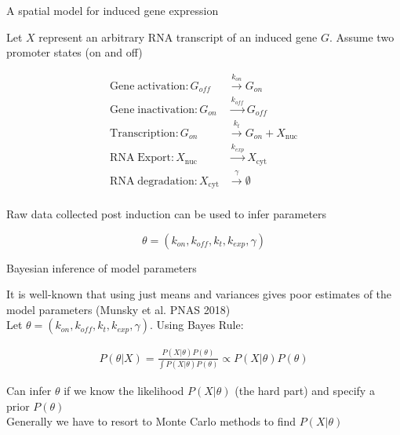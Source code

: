 \documentclass[aspectratio=1610]{beamer}					%
\begin{document}
\begin{frame}{A spatial model for induced gene expression}

Let $X$ represent an arbitrary RNA transcript of an induced gene $G$. Assume two promoter states (on and off)

\begin{align*}
\mathrm{Gene\;activation}: G_{off} &\overset{k_{on}}{\rightarrow} G_{on}\\
\mathrm{Gene\;inactivation}: G_{on} &\overset{k_{off}}{\rightarrow} G_{off}\\
\mathrm{Transcription}: G_{on} &\overset{k_{t}}{\rightarrow} G_{on} + X_{\mathrm{nuc}}\\
\mathrm{RNA \;Export}: X_{\mathrm{nuc}} &\overset{k_{exp}}{\rightarrow} X_{\mathrm{cyt}}\\
\mathrm{RNA\; degradation}: X_{\mathrm{cyt}} &\overset{\gamma}{\rightarrow} \emptyset\\
\end{align*}

Raw data collected post induction can be used to infer parameters

\begin{equation*}
\theta = \left( k_{on},k_{off},k_{t},k_{exp},\gamma\right)
\end{equation*}

\end{frame}

\begin{frame}{Bayesian inference of model parameters}

It is well-known that using just means and variances gives poor estimates of the model parameters (Munsky et al. PNAS 2018)\\
\vspace{0.2in}
Let $\theta = \left( k_{on},k_{off},k_{t},k_{exp},\gamma\right)$. Using Bayes Rule: 

\begin{align*}
P(\theta|X) = \frac{P(X|\theta)P(\theta)}{\int P(X|\theta)P(\theta)} \propto P(X|\theta)P(\theta)
\end{align*}

Can infer $\theta$ if we know the likelihood $P(X|\theta)$ (the hard part) and specify a prior $P(\theta)$\\
\vspace{0.2in}
Generally we have to resort to Monte Carlo methods to find $P(X|\theta)$

\end{frame}
\end{document}
